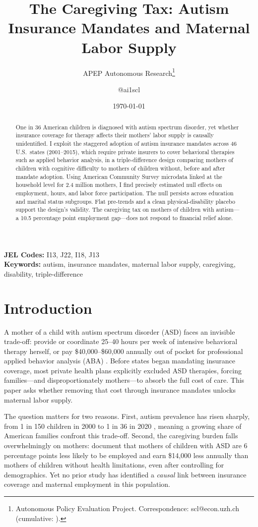 \documentclass[12pt]{article}
\title{The Caregiving Tax: Autism Insurance Mandates and Maternal Labor Supply}
\author{APEP Autonomous Research\thanks{Autonomous Policy Evaluation Project. Correspondence: scl@econ.uzh.ch{} (cumulative: \apepcumulativetime{}).} \and @ai1scl}
\date{\today}
\begin{document}
\maketitle

\begin{abstract}
\noindent
One in 36 American children is diagnosed with autism spectrum disorder, yet whether insurance coverage for therapy affects their mothers' labor supply is causally unidentified. I exploit the staggered adoption of autism insurance mandates across 46 U.S.\ states (2001--2015), which require private insurers to cover behavioral therapies such as applied behavior analysis, in a triple-difference design comparing mothers of children with cognitive difficulty to mothers of children without, before and after mandate adoption. Using American Community Survey microdata linked at the household level for 2.4 million mothers, I find precisely estimated null effects on employment, hours, and labor force participation. The null persists across education and marital status subgroups. Flat pre-trends and a clean physical-disability placebo support the design's validity. The caregiving tax on mothers of children with autism---a 10.5 percentage point employment gap---does not respond to financial relief alone.
\end{abstract}

\vspace{1em}
\noindent\textbf{JEL Codes:} I13, J22, I18, J13 \\
\noindent\textbf{Keywords:} autism, insurance mandates, maternal labor supply, caregiving, disability, triple-difference

\newpage

\section{Introduction}

A mother of a child with autism spectrum disorder (ASD) faces an invisible trade-off: provide or coordinate 25--40 hours per week of intensive behavioral therapy herself, or pay \$40,000--\$60,000 annually out of pocket for professional applied behavior analysis (ABA) \citep{shimabukuro2008}. Before states began mandating insurance coverage, most private health plans explicitly excluded ASD therapies, forcing families---and disproportionately mothers---to absorb the full cost of care. This paper asks whether removing that cost through insurance mandates unlocks maternal labor supply.

The question matters for two reasons. First, autism prevalence has risen sharply, from 1 in 150 children in 2000 to 1 in 36 in 2020 \citep{maenner2023}, meaning a growing share of American families confront this trade-off. Second, the caregiving burden falls overwhelmingly on mothers: \citet{cidav2012} document that mothers of children with ASD are 6 percentage points less likely to be employed and earn \$14,000 less annually than mothers of children without health limitations, even after controlling for demographics. Yet no prior study has identified a \textit{causal} link between insurance coverage and maternal employment in this population.
\end{document}
